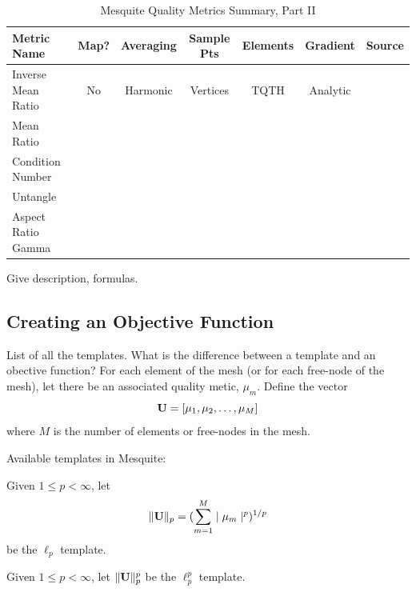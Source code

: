 \documentclass[psfig]{article}
\begin{document}
\begin{table}[h]
\begin{center}
\begin{tabular}{|l|c|c|c|c|c|c|}
\hline
Metric Name & Map? & Averaging & Sample Pts & Elements & Gradient & Source \\ \hline
Inverse Mean Ratio & No & Harmonic & Vertices & TQTH & Analytic & \\ 
Mean Ratio &  &  &  &  &  \\ 
Condition Number &  &  &  &  &  \\ 
Untangle &  &  &  &  &  \\ 
Aspect Ratio Gamma &  &  &  &  &  \\ 
\hline
\end{tabular}
\caption{\label{QualityMetrics2} Mesquite Quality Metrics Summary, Part II}
\end{center}
\end{table}

 \newline
Give description, formulas. 

\subsection{Creating an Objective Function}
List of all the templates. What is the difference between a template and
an obective function? For each element of the mesh (or for each 
free-node of the mesh), let there be an associated quality metic, 
$\mu_m$.  Define the vector 
\begin{equation}
{\bf U} = [ \mu_1, \mu_2, \ldots, \mu_M ]
\end{equation}
where $M$ is the number of elements or free-nodes in the mesh. \newline

\noindent Available templates in Mesquite: \newline

 \newline
Given $1 \leq p < \infty$, let
\begin{equation}
\| {\bf U} \|_p = ( \sum_{m=1}^M \mid \mu_m \mid^p )^{1/p}
\end{equation}
be the $\ell_p$ template. \newline

 \newline
Given $1 \leq p < \infty$, let $\| {\bf U} \|_p^p$ be the 
$\ell_p^p$ template. \newline
\end{document}
